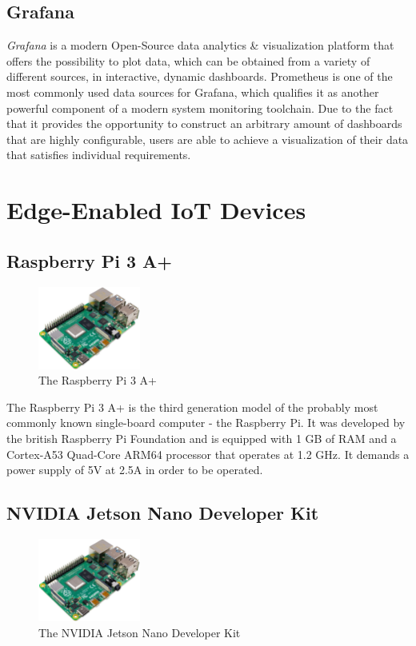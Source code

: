 \subsection{Grafana}
\textit{Grafana} is a modern Open-Source data analytics \& visualization platform that offers the possibility to plot data, which can be obtained from a variety of different sources, in interactive, dynamic dashboards. Prometheus is one of the most commonly used data sources for Grafana, which qualifies it as another powerful component of a modern system monitoring toolchain. Due to the fact that it provides the opportunity to construct an arbitrary amount of dashboards that are highly configurable, users are able to achieve a visualization of their data that satisfies individual requirements.


\section{Edge-Enabled IoT Devices}

\subsection{Raspberry Pi 3 A+}

\begin{figure}[h]
    \centering
    \includegraphics[width=0.30\textwidth]{./figures/mesh}
    \caption{The Raspberry Pi 3 A+}
    \label{fig:raspberry-pi}
\end{figure}


The Raspberry Pi 3 A+ is the third generation model of the probably most commonly known single-board computer - the Raspberry Pi. It was developed by the british Raspberry Pi Foundation and is equipped with 1 GB of RAM and a Cortex-A53 Quad-Core ARM64 processor that operates at 1.2 GHz. It demands a power supply of 5V at 2.5A in order to be operated.

\subsection{NVIDIA Jetson Nano Developer Kit}

\begin{figure}[h]
    \centering
    \includegraphics[width=0.30\textwidth]{./figures/mesh}
    \caption{The NVIDIA Jetson Nano Developer Kit}
    \label{fig:jetson-nano}
\end{figure}

